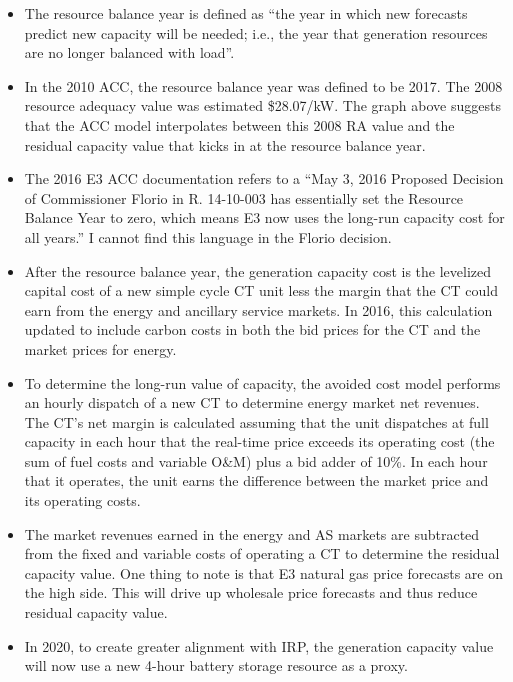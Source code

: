 \documentclass[11pt]{article}
\begin{document}
\begin{itemize}

\item The resource balance year is defined as “the year in which new forecasts predict new capacity will be needed; i.e., the year that generation resources are no longer balanced with load”. 

\item In the 2010 ACC, the resource balance year was defined to be 2017. The 2008 resource adequacy value was estimated \$28.07/kW.  The graph above suggests that the ACC model interpolates between this 2008 RA value and the residual capacity value that kicks in at the resource balance year.

\item The 2016 E3 ACC documentation refers to a “May 3, 2016 Proposed Decision of Commissioner Florio in R. 14-10-003 has essentially set the Resource Balance Year to zero, which means E3 now uses the long-run capacity cost for all years.”  I cannot find this language in the Florio decision. 

\item After the resource balance year, the generation capacity cost is the levelized capital cost of a new simple cycle CT unit less the margin that the CT could earn from the energy and ancillary service markets. In 2016, this calculation updated to include carbon costs in both the bid prices for the CT and the market prices for energy.

\item To determine the long-run value of capacity, the avoided cost model performs an hourly dispatch of a new CT to determine energy market net revenues. The CT’s net margin is calculated assuming that the unit dispatches at full capacity in each hour that the real-time price exceeds its operating cost (the sum of fuel costs and variable O&M) plus a bid adder of 10\%.  In each hour that it operates, the unit earns the difference between the market price and its operating costs.  

\item The market revenues earned in the energy and AS markets are subtracted from the fixed and variable costs of operating a CT to determine the residual capacity value.   One thing to note is that E3 natural gas price forecasts are on the high side. This will drive up wholesale price forecasts and thus reduce residual capacity value. 

\item In 2020, to create greater alignment with IRP, the generation capacity value will now use a new 4-hour
battery storage resource as a proxy. 


\end{itemize}
\end{document}
